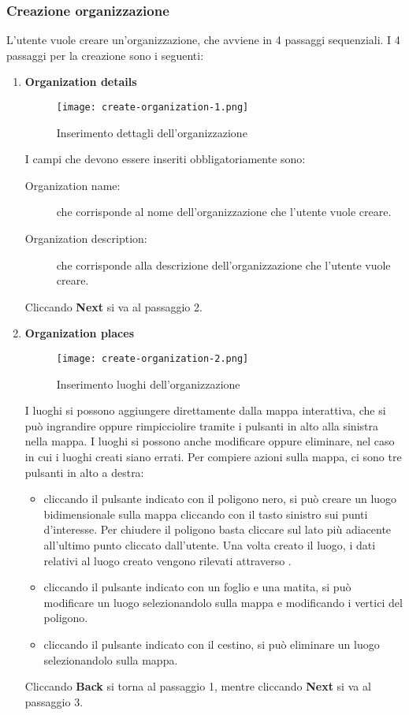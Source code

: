 \documentclass[../manuale-utente.tex]{subfiles}
\begin{document}
\subsubsection{Creazione organizzazione}%
\label{subs:creazione_organizzazione}

L'utente vuole creare un'organizzazione, che avviene in 4 passaggi sequenziali.
I 4 passaggi per la creazione sono i seguenti:
\begin{enumerate}
    \item \textbf{Organization details}

    \begin{figure}[H]
      \centering
      \texttt{[image: create-organization-1.png]}
      \caption{Inserimento dettagli dell'organizzazione}%
      \label{fig:web_app_inserimento_dettagli_organizzazione}
    \end{figure}
    I campi che devono essere inseriti obbligatoriamente sono:
    \begin{description}
      \item[Organization name:] che corrisponde al nome dell'organizzazione che l'utente vuole creare.
      \item[Organization description:] che corrisponde alla descrizione dell'organizzazione che l'utente vuole creare.
    \end{description}
    Cliccando \textbf{Next} si va al passaggio 2.

    \item \textbf{Organization places}

    \begin{figure}[H]
      \centering
      \texttt{[image: create-organization-2.png]}
      \caption{Inserimento luoghi dell'organizzazione}%
      \label{fig:web_app_inserimento_luoghi_organizzazione}
    \end{figure}
    I luoghi si possono aggiungere direttamente dalla mappa interattiva, che si può ingrandire oppure rimpicciolire tramite i pulsanti in alto alla sinistra nella mappa.
    I luoghi si possono anche modificare oppure eliminare, nel caso in cui i luoghi creati siano errati.
    Per compiere azioni sulla mappa, ci sono tre pulsanti in alto a destra:
    \begin{itemize}
        \item cliccando il pulsante indicato con il poligono nero, si può creare un luogo bidimensionale sulla mappa cliccando con il tasto sinistro sui punti d'interesse. Per chiudere il poligono basta cliccare sul lato più adiacente all'ultimo punto cliccato dall'utente. Una volta creato il luogo, i dati relativi al luogo creato vengono rilevati attraverso .
        \item cliccando il pulsante indicato con un foglio e una matita, si può modificare un luogo selezionandolo sulla mappa e modificando i vertici del poligono.
        \item cliccando il pulsante indicato con il cestino, si può eliminare un luogo selezionandolo sulla mappa.
    \end{itemize}
    Cliccando \textbf{Back} si torna al passaggio 1, mentre cliccando \textbf{Next} si va al passaggio 3.


\end{enumerate}
\end{document}
